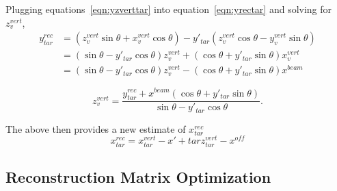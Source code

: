 Plugging equations~\ref{eqn:yzverttar} into equation~\ref{eqn:yrectar} and
solving for $z^{vert}_v$,
\begin{align}
y^{rec}_{tar} &= (z^{vert}_v \sin\theta + x^{vert}_v \cos\theta) -
                 y'_{tar} (z^{vert}_v \cos\theta - y^{vert}_v \sin\theta) \\
              &= (\sin\theta-y'_{tar}\cos\theta)z^{vert}_v +
                 (\cos\theta + y'_{tar} \sin\theta) x^{vert}_v \\
              &= (\sin\theta-y'_{tar}\cos\theta)z^{vert}_v -
                 (\cos\theta + y'_{tar} \sin\theta) x^{beam}
\end{align}

\begin{equation}
z^{vert}_v = \frac{y^{rec}_{tar} + x^{beam} (\cos\theta + y'_{tar} \sin\theta)}
                  {\sin\theta - y'_{tar}\cos\theta}.
\end{equation}

The above then provides a new estimate of $x^{rec}_{tar}$
\begin{equation}
x^{rec}_{tar} = x^{vert}_{tar} - x'+{tar}z^{vert}_{tar} - x^{off}
\end{equation}

\subsection{Reconstruction Matrix Optimization}
